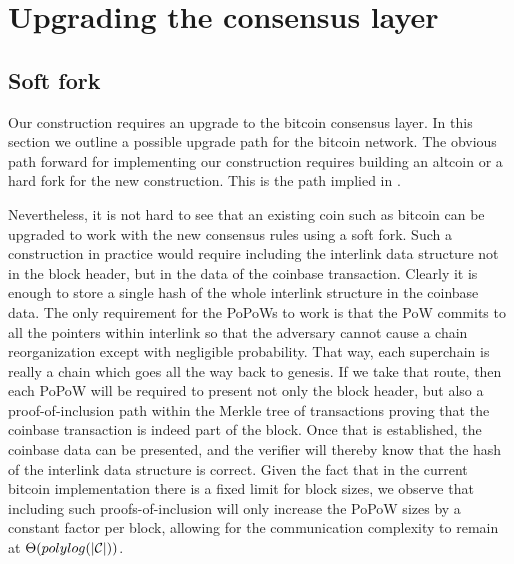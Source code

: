 \section{Upgrading the consensus layer}

\subsection{Soft fork}

Our construction requires an upgrade to the bitcoin consensus layer. In this
section we outline a possible upgrade path for the bitcoin network. The obvious
path forward for implementing our construction requires building an altcoin or
a hard fork for the new construction. This is the path implied in
\cite{KLS}.

Nevertheless, it is not hard to see that an existing coin such as bitcoin can
be upgraded to work with the new consensus rules using a soft fork.  Such a
construction in practice would require including the interlink data structure
not in the block header, but in the data of the coinbase transaction.  Clearly
it is enough to store a single hash of the whole interlink structure in the
coinbase data. The only requirement for the PoPoWs to work is that the
PoW commits to all the pointers within interlink so that the adversary cannot
cause a chain reorganization except with negligible probability. That way, each
superchain is really a chain which goes all the way back to genesis. If we take
that route, then each PoPoW will be required to present not only the block
header, but also a proof-of-inclusion path within the Merkle tree of
transactions proving that the coinbase transaction is indeed part of the block.
Once that is established, the coinbase data can be presented, and the verifier
will thereby know that the hash of the interlink data structure is correct.
Given the fact that in the current bitcoin implementation there is a fixed
limit for block sizes, we observe that including such proofs-of-inclusion will
only increase the PoPoW sizes by a constant factor per block, allowing for the
communication complexity to remain at $\Theta(polylog(|\mathcal{C}|))$.

